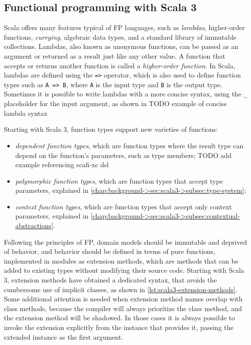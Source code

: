


\subsection{Functional programming with Scala 3} \label{chap:background->sec:scala3->subsec:functional-programming}

Scala offers many features typical of \ac{FP} languages, such as \textit{lambdas}, higher-order functions, \textit{currying}, algebraic data types, and a standard library of immutable collections.
%
Lambdas, also known as anonymous functions, can be passed as an argument or returned as a result just like any other value.
%
A function that accepts or returns another function is called a \textit{higher-order function}.
%
In Scala, lambdas are defined using the \texttt{=>} operator, which is also used to define function types such as \texttt{A => B}, where \texttt{A} is the input type and \texttt{B} is the output type.
%
Sometimes it is possible to write lambdas with a more concise syntax, using the \texttt{\_} placeholder for the input argument, as shown in 
TODO example of concise lambda syntax

Starting with Scala 3, function types support new varieties of functions:
\begin{itemize}
    \item \textit{dependent function types}, which are function types where the result type can depend on the function's parameters, such as type members;
TODO add example referencing scafi-xc dsl
    \item \textit{polymorphic function types}, which are function types that accept type parameters, explained in \cref{chap:background->sec:scala3->subsec:type-system};
    \item \textit{context function types}, which are function types that accept only context parameters, explained in \cref{chap:background->sec:scala3->subsec:contextual-abstractions}.
\end{itemize}

Following the principles of \ac{FP}, domain models should be immutable and deprived of behavior, and behavior should be defined in terms of pure functions, implemented in modules as extension methods, which are methods that can be added to existing types without modifying their source code.
%
Starting with Scala 3, extension methods have obtained a dedicated syntax, that avoids the cumbersome use of implicit classes, as shown in \cref{lst:scala3-extension-methods}.
%
Some additional attention is needed when extension method names overlap with class methods, because the compiler will always prioritize the class method, and the extension method will be shadowed.
%
In those cases it is always possible to invoke the extension explicitly from the instance that provides it, passing the extended instance as the first argument.

